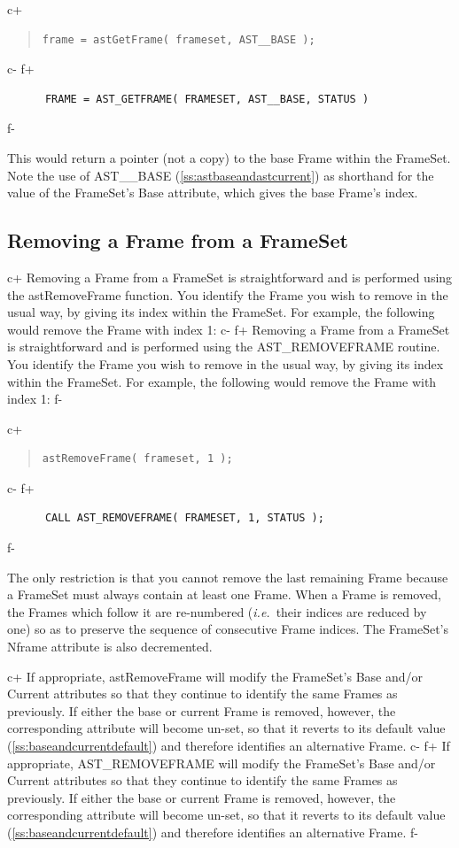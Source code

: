 \documentclass[twoside,11pt]{article}
\newcommand{\secref}[1]{\S\ref{#1}}
\renewcommand{\secref}[1]{\ref{#1}}
\begin{document}
c+
\begin{quote}
\small
\begin{verbatim}
frame = astGetFrame( frameset, AST__BASE );
\end{verbatim}
\normalsize
\end{quote}
c-
f+
\small
\begin{verbatim}
      FRAME = AST_GETFRAME( FRAMESET, AST__BASE, STATUS )
\end{verbatim}
\normalsize
f-

This would return a pointer (not a copy) to the base Frame within the
FrameSet. Note the use of AST\_\_BASE
(\secref{ss:astbaseandastcurrent}) as shorthand for the value of the
FrameSet's Base attribute, which gives the base Frame's index.

\subsection{Removing a Frame from a FrameSet}

c+
Removing a Frame from a FrameSet is straightforward and is performed
using the astRemoveFrame function. You identify the Frame you wish to
remove in the usual way, by giving its index within the FrameSet. For
example, the following would remove the Frame with index 1:
c-
f+
Removing a Frame from a FrameSet is straightforward and is performed
using the AST\_REMOVEFRAME routine. You identify the Frame you wish to
remove in the usual way, by giving its index within the FrameSet. For
example, the following would remove the Frame with index 1:
f-

c+
\begin{quote}
\small
\begin{verbatim}
astRemoveFrame( frameset, 1 );
\end{verbatim}
\normalsize
\end{quote}
c-
f+
\small
\begin{verbatim}
      CALL AST_REMOVEFRAME( FRAMESET, 1, STATUS );
\end{verbatim}
\normalsize
f-

The only restriction is that you cannot remove the last remaining
Frame because a FrameSet must always contain at least one Frame.  When
a Frame is removed, the Frames which follow it are re-numbered
({\em{i.e.}}\ their indices are reduced by one) so as to preserve the
sequence of consecutive Frame indices.  The FrameSet's Nframe
attribute is also decremented.

c+
If appropriate, astRemoveFrame will modify the FrameSet's Base and/or
Current attributes so that they continue to identify the same Frames
as previously. If either the base or current Frame is removed,
however, the corresponding attribute will become un-set, so that it
reverts to its default value (\secref{ss:baseandcurrentdefault}) and
therefore identifies an alternative Frame.
c-
f+
If appropriate, AST\_REMOVEFRAME will modify the FrameSet's Base
and/or Current attributes so that they continue to identify the same
Frames as previously. If either the base or current Frame is removed,
however, the corresponding attribute will become un-set, so that it
reverts to its default value (\secref{ss:baseandcurrentdefault}) and
therefore identifies an alternative Frame.
f-
\end{document}
